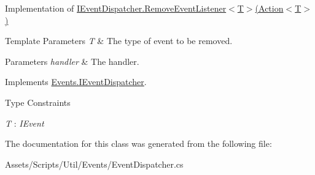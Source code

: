 Implementation of \hyperlink{interface_events_1_1_i_event_dispatcher_a86e3438c779746108c3f01dff0c43d23}{I\+Event\+Dispatcher.\+Remove\+Event\+Listener$<$\+T$>$(\+Action$<$\+T$>$)} 


\begin{DoxyTemplParams}{Template Parameters}
{\em T} & The type of event to be removed.\\
\hline
\end{DoxyTemplParams}

\begin{DoxyParams}{Parameters}
{\em handler} & The handler.\\
\hline
\end{DoxyParams}


Implements \hyperlink{interface_events_1_1_i_event_dispatcher_a86e3438c779746108c3f01dff0c43d23}{Events.\+I\+Event\+Dispatcher}.

\begin{Desc}
\item[Type Constraints]\begin{description}
\item[{\em T} : {\em I\+Event}]\end{description}
\end{Desc}


The documentation for this class was generated from the following file\+:\begin{DoxyCompactItemize}
\item 
Assets/\+Scripts/\+Util/\+Events/Event\+Dispatcher.\+cs\end{DoxyCompactItemize}
